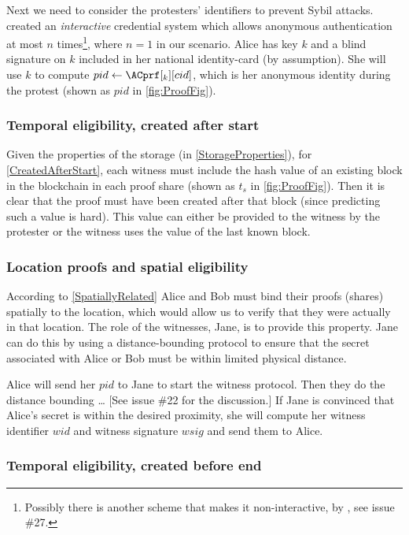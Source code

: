 Next we need to consider the protesters' identifiers to prevent Sybil attacks.
 created an \emph{interactive} credential system 
which allows anonymous authentication at most \(n\) times\footnote{%
  Possibly there is another scheme that makes it non-interactive, \eg by 
  \citet{Psignatures}, see issue \#27.
}, where \(n = 1\) in our scenario.
Alice has  key \(k\) and a blind signature on \(k\) included in her 
national identity-card (by assumption).
She will use \(k\) to compute \(pid\gets \ACprf[_k][cid]\), which is her 
anonymous identity during the protest (shown as \(pid\) in \cref{fig:ProofFig}).

\subsubsection{Temporal eligibility, created after start}

Given the properties of the storage (in \cref{StorageProperties}), for 
\cref{CreatedAfterStart}, each witness must include the hash value of an 
existing block in the blockchain in each proof share (shown as \(t_s\) in 
\cref{fig:ProofFig}).
Then it is clear that the proof must have been created after that block (since 
predicting such a value is hard).
This value can either be provided to the witness by the protester or the witness 
uses the value of the last known block.

\subsubsection{Location proofs and spatial eligibility}

According to \cref{SpatiallyRelated} Alice and Bob must bind their proofs 
(shares) spatially to the location, which would allow us to verify that they 
were actually in that location.
The role of the witnesses, \eg Jane, is to provide this property.
Jane can do this by using a distance-bounding protocol to ensure that the secret 
associated with Alice or Bob must be within limited physical distance.

Alice will send her \(pid\) to Jane to start the witness protocol.
Then they do the distance bounding \dots
[See issue \#22 for the discussion.]
If Jane is convinced that Alice's secret is within the desired proximity, she 
will compute her witness identifier \(wid\) and witness signature \(wsig\) and 
send them to Alice.

\subsubsection{Temporal eligibility, created before end}

